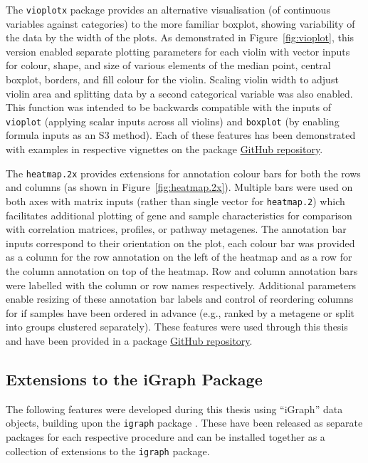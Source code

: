The \texttt{vioplotx} package provides an alternative visualisation (of continuous variables against categories) to the more familiar boxplot, showing variability of the data by the width of the plots. As demonstrated in Figure~\ref{fig:vioplot}, this version enabled separate plotting parameters for each violin with vector inputs for colour, shape, and size of various elements of the median point, central boxplot, borders, and fill colour for the violin. Scaling violin width to adjust violin area and splitting data by a second categorical variable was also enabled. This function was intended to be backwards compatible with the inputs of \texttt{vioplot} (applying scalar inputs across all violins) and \texttt{boxplot} (by enabling formula inputs as an S3 method). Each of these features has been demonstrated with examples in respective vignettes on the package \href{https://github.com/TomKellyGenetics/vioplotx}{GitHub repository}.

The \texttt{heatmap.2x} provides extensions for annotation colour bars for both the rows and columns (as shown in Figure~\ref{fig:heatmap.2x}). Multiple bars were used on both axes with matrix inputs (rather than single vector for \texttt{heatmap.2}) which facilitates additional plotting of gene and sample characteristics for comparison with correlation matrices,  profiles, or pathway \glspl{metagene}. The annotation bar inputs correspond to their orientation on the plot, each colour bar was provided as a column for the row annotation on the left of the heatmap and as a row for the column annotation on top of the heatmap. Row and column annotation bars were labelled with the column or row names respectively. Additional parameters enable resizing of these annotation bar labels and control of reordering columns for if samples have been ordered in advance (e.g., ranked by a \gls{metagene} or split into groups clustered separately).  These features were used through this thesis and have been provided in a package \href{https://github.com/TomKellyGenetics/heatmap.2x}{GitHub repository}.


\FloatBarrier

\subsection{Extensions to the iGraph Package} \label{methods:igraph_extensions}
The following features were developed during this thesis using ``iGraph'' data objects, building upon the \texttt{igraph} package \citep{igraph}. These have been released as separate packages for each respective procedure and can be installed together as a collection of extensions to the \texttt{igraph} package.

